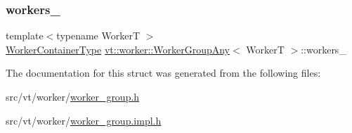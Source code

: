 \mbox{\label{structvt_1_1worker_1_1_worker_group_any_a370802bca31db13895b73f19d699ea3b}} 
\subsubsection{\texorpdfstring{workers\+\_\+}{workers\_}}
{\footnotesize\ttfamily template$<$typename WorkerT $>$ \\
\hyperlink{structvt_1_1worker_1_1_worker_group_any_ad7e74c099f11c75bc35c838baedaa2cd}{Worker\+Container\+Type} \hyperlink{structvt_1_1worker_1_1_worker_group_any}{vt\+::worker\+::\+Worker\+Group\+Any}$<$ WorkerT $>$\+::workers\+\_\+\hspace{0.3cm}{\ttfamily [private]}}



The documentation for this struct was generated from the following files\+:\begin{DoxyCompactItemize}
\item 
src/vt/worker/\hyperlink{worker__group_8h}{worker\+\_\+group.\+h}\item 
src/vt/worker/\hyperlink{worker__group_8impl_8h}{worker\+\_\+group.\+impl.\+h}\end{DoxyCompactItemize}
